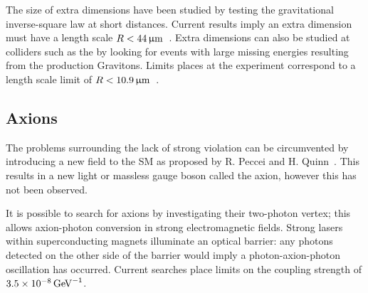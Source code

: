 The size of extra dimensions have been studied by testing the gravitational inverse-square law at short distances. Current results imply an extra dimension must have a length scale $R < 44 {\,\upmu\mathrm{m}}$~\cite{Kapner:2006si}.
Extra dimensions can also be studied at colliders such as the \lhc by looking for events with large missing energies resulting from the production Gravitons. Limits places at the \atlas experiment correspond to a length scale limit of $R < 10.9 {\,\upmu\mathrm{m}}$~\cite{Aaboud:2016tnv}.    

\subsection{Axions}
The problems surrounding the lack of strong \CP violation can be circumvented by introducing a new field to the SM as proposed by R. Peccei and H. Quinn~\cite{PhysRevLett.38.1440}. This results in a new light or massless gauge boson called the axion, however this has not been observed.     

It is possible to search for axions by investigating their two-photon vertex; this allows axion-photon conversion in strong electromagnetic fields. Strong lasers within superconducting magnets illuminate an optical barrier: any photons detected on the other side of the barrier would imply a photon-axion-photon oscillation has occurred. Current searches place limits on the coupling strength of $3.5\times10^{-8} \mathrm{\,Ge\kern -0.1em V}^{-1}$\cite{Ballou:2015cka}.  



